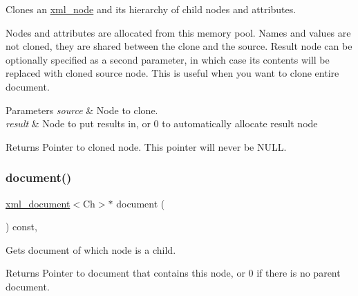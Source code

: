 Clones an \mbox{\hyperlink{classrapidxml_1_1xml__node}{xml\+\_\+node}} and its hierarchy of child nodes and attributes. 

Nodes and attributes are allocated from this memory pool. Names and values are not cloned, they are shared between the clone and the source. Result node can be optionally specified as a second parameter, in which case its contents will be replaced with cloned source node. This is useful when you want to clone entire document. 
\begin{DoxyParams}{Parameters}
{\em source} & Node to clone. \\
\hline
{\em result} & Node to put results in, or 0 to automatically allocate result node \\
\hline
\end{DoxyParams}
\begin{DoxyReturn}{Returns}
Pointer to cloned node. This pointer will never be N\+U\+LL. 
\end{DoxyReturn}
\mbox{\label{classrapidxml_1_1xml__node_ae5396d92d09394b37838f2518f430da4}} 
\subsubsection{\texorpdfstring{document()}{document()}}
{\footnotesize\ttfamily \mbox{\hyperlink{classrapidxml_1_1xml__document}{xml\+\_\+document}}$<$Ch$>$$\ast$ document (\begin{DoxyParamCaption}{ }\end{DoxyParamCaption}) const\hspace{0.3cm}{\ttfamily [inline]}, {\ttfamily [inherited]}}



Gets document of which node is a child. 

\begin{DoxyReturn}{Returns}
Pointer to document that contains this node, or 0 if there is no parent document. 
\end{DoxyReturn}
\mbox{\label{classrapidxml_1_1xml__node_a3cbbee0d76d96c3315cc9d80d169c8d9}} 

